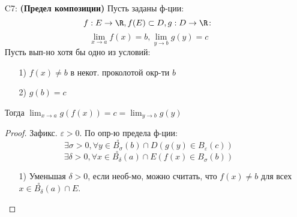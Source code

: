 \begin{itemize}
    \[
      \exists \delta > 0, \exists C > 0, \forall x \in \overset{\circ}{B_{\delta}}(a) \cap E ( \left|f(x)\right| \leq C)
    \]
    \begin{proof}
    Пусть $\lim_{x\to a} f(x) = b$. Тода
    \[
      \exists \delta > 0, \forall x \in \overset{\circ}{B_{\delta}}(a) \cap E ( b - 1 < f(x) < b + 1) (\varepsilon = 1)
    \]
   Положим тогда $C = \left|b\right| + 1$.
    \end{proof}
  \item [C7: ] \textbf{(Предел композиции)} Пусть заданы ф-ции:
    \[
    f: E \rightarrow \R, f(E) \subset D, g: D \rightarrow \R \colon 
    \]
    \[
    \lim_{x\to a} f(x) = b, \lim_{y\to b} g(y) = c
    \]
    Пусть вып-но хотя бы одно из условий:
    \begin{itemize}
      \item [1) ] $f(x) \neq b$ в некот. проколотой окр-ти $b$
      \item [2) ] $g(b) = c$
    \end{itemize}
    Тогда $\lim_{x\to a} g(f(x)) = c = \lim_{y\to b} g(y)$
    \begin{proof}
    Зафикс. $\varepsilon > 0$. По опр-ю предела ф-ции:
    \[
    \exists \sigma > 0, \forall y \in \overset{\circ}{B_{\sigma}}(b) \cap D ( g(y) \in B_{\varepsilon}(c))
    \]
    \[
    \exists \delta > 0, \forall x \in \overset{\circ}{B_{\delta}}(a) \cap E (f(x) \in B_{\sigma}(b))
    \]
    \begin{itemize}
      \item [1) ] Уменьшая $\delta > 0$, если необ-мо, можно считать, что $f(x) \neq b$ для всех $x \in \overset{\circ}{B_{\delta}}(a) \cap E$. \\


\end{itemize}
\end{proof}
\end{itemize}
